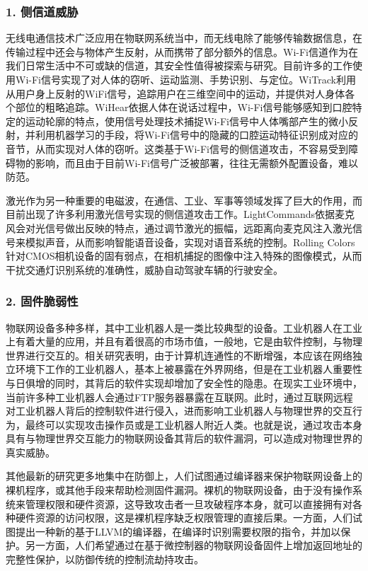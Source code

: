\subsubsection{\textcolor{myblue}{\textbf{1. 侧信道威胁 }}}
无线电通信技术广泛应用在物联网系统当中，而无线电除了能够传输数据信息，在传输过程中还会与物体产生反射，从而携带了部分额外的信息。Wi-Fi信道作为在我们日常生活中不可或缺的信道，其安全性值得被探索与研究。目前许多的工作使用Wi-Fi信号实现了对人体的窃听、运动监测、手势识别、与定位。WiTrack\cite{witrack}利用从用户身上反射的WiFi信号，追踪用户在三维空间中的运动，并提供对人身体各个部位的粗略追踪。WiHear\cite{wihear}依据人体在说话过程中，Wi-Fi信号能够感知到口腔特定的运动轮廓的特点，使用信号处理技术捕捉Wi-Fi信号中人体嘴部产生的微小反射，并利用机器学习的手段，将Wi-Fi信号中的隐藏的口腔运动特征识别成对应的音节，从而实现对人体的窃听。这类基于Wi-Fi信号的侧信道攻击，不容易受到障碍物的影响，而且由于目前Wi-Fi信号广泛被部署，往往无需额外配置设备，难以防范。

激光作为另一种重要的电磁波，在通信、工业、军事等领域发挥了巨大的作用，而目前出现了许多利用激光信号实现的侧信道攻击工作。LightCommands\cite{lightcommands}依据麦克风会对光信号做出反映的特点，通过调节激光的振幅，远距离向麦克风注入激光信号来模拟声音，从而影响智能语音设备，实现对语音系统的控制。Rolling Colors\cite{rolling colors}针对CMOS相机设备的固有弱点，在相机捕捉的图像中注入特殊的图像模式，从而干扰交通灯识别系统的准确性，威胁自动驾驶车辆的行驶安全。


\subsubsection{\textcolor{myblue}{\textbf{2. 固件脆弱性 }}}

物联网设备多种多样，其中工业机器人是一类比较典型的设备。工业机器人在工业上有着大量的应用，并且有着很高的市场市值，一般地，它是由软件控制，与物理世界进行交互的。相关研究\cite{InjectRobot}表明，由于计算机连通性的不断增强，本应该在网络独立环境下工作的工业机器人，基本上被暴露在外界网络，但是在工业机器人重要性与日俱增的同时，其背后的软件实现却增加了安全性的隐患。在现实工业环境中，当前许多种工业机器人会通过FTP服务器暴露在互联网。此时，通过互联网远程对工业机器人背后的控制软件进行侵入，进而影响工业机器人与物理世界的交互行为，最终可以实现攻击操作员或是工业机器人附近人类。也就是说，通过攻击本身具有与物理世界交互能力的物联网设备其背后的软件漏洞，可以造成对物理世界的真实威胁。

其他最新的研究更多地集中在防御上，人们试图通过编译器来保护物联网设备上的裸机程序，或其他手段来帮助检测固件漏洞。裸机的物联网设备，由于没有操作系统来管理权限和硬件资源，这导致攻击者一旦攻破程序本身，就可以直接拥有对各种硬件资源的访问权限，这是裸机程序缺乏权限管理的直接后果。一方面，人们试图提出一种新的基于LLVM的编译器\cite{PriviSep}，在编译时识别需要权限的指令，并加以保护。另一方面，人们希望通过在基于微控制器的物联网设备固件上增加返回地址的完整性保护\cite{muRAI}，以防御传统的控制流劫持攻击。











